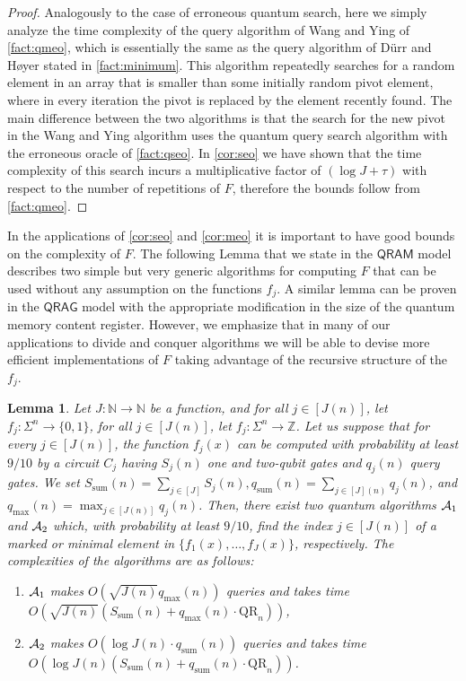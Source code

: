\documentclass[12pt]{article}
\newcommand{\qr}{\mathrm{QR}}
\newcommand{\su}{\mathrm{sum}}
\newcommand{\N}{\mathbb{N}}
\newcommand{\Z}{\mathbb{Z}}
\newtheorem{lemma}[theorem]{Lemma}
\theoremstyle{definition}
\begin{document}
\begin{proof}
Analogously to the case of erroneous quantum search, here we simply analyze the time complexity of the query algorithm of Wang and Ying of \cref{fact:qmeo}, which is essentially the same as the query algorithm of D\"urr and H{\o}yer stated in \cref{fact:minimum}. This algorithm repeatedly searches for a random element in an array that is smaller than some initially random pivot element, where in every iteration the pivot is replaced by the element recently found. 
The main difference between the two algorithms is that the search for the new pivot in the Wang and Ying algorithm uses the quantum query search algorithm with the erroneous oracle of \cref{fact:qseo}. In \cref{cor:seo} we have shown that the time complexity of this search incurs a multiplicative factor of  $( \log J + \tau)$ with respect to the number of repetitions of $F$, therefore the bounds follow from \cref{fact:qmeo}.
\end{proof}

In the applications of \cref{cor:seo} and \cref{cor:meo} it is important to have good bounds on the complexity of $F$. The following Lemma that we state in the $\mathsf{QRAM}$ model describes two simple but very generic algorithms for computing $F$ that can be used without any assumption on the functions $f_j$. 
A similar lemma can be proven in the $\mathsf{QRAG}$ model with the appropriate modification in the size of the quantum memory content register.
However, we emphasize that in many of our applications to divide and conquer algorithms we will be able to devise more efficient implementations of $F$ taking advantage of the recursive structure of the $f_j$.

\begin{lemma}
\label{lem:two}
Let $J : \N \rightarrow \N$ be a function, and for all $j \in [J(n)]$, let $f_j : \Sigma^n \rightarrow \{0,1\}$, for all $j \in [J(n)]$, let $f_j : \Sigma^n \rightarrow \Z$.
Let us suppose that for every $j \in [J(n)]$, the function $f_j(x)$ can be computed with probability at least $9/10$ by a circuit $C_j$ having $S_j(n)$ one and two-qubit gates and $q_j(n)$ query gates.  
We set $S_{\su}(n) = \sum_{j \in [J]} S_j(n), q_{\su}(n) = \sum_{j \in [J](n)} q_j(n)$, and $q_{\max}(n) = \max_{j \in [J(n)]} q_j(n)$.
Then, there exist two quantum algorithms ${\cal A}_1$ and  ${\cal A}_2$ which, with probability at least $9/10$, find the index $j \in [J(n)]$ of a marked or minimal element in $\{f_1(x), \ldots , f_J(x)\}$, respectively.  The complexities of the algorithms are as follows:
\begin{enumerate}
\item
${\cal A}_1$ makes $O(\sqrt{J(n)} q_{\max}(n)  )$ queries and takes time $O(\sqrt{J(n)} (S_{\su}(n) +q_{\max}(n) \cdot \qr_n))$,
\item
${\cal A}_2$ makes $O(\log J(n)  \cdot q_{\su}(n)  )$ queries and takes time $O(\log{J(n)} (S_{\su}(n) +  q_{\su}(n) \cdot \qr_n))$.
\end{enumerate}
\end{lemma}
\end{document}
